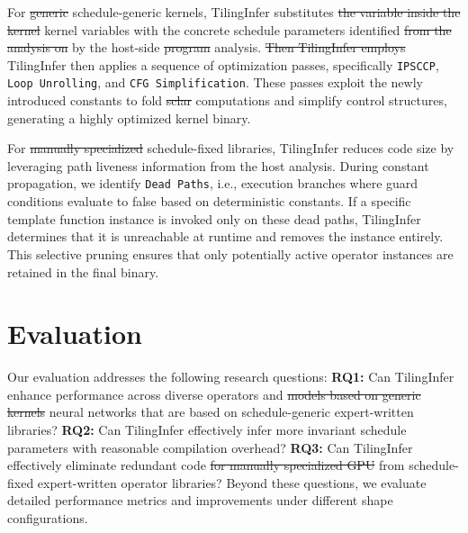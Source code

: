 \documentclass[manuscript,screen,review]{acmart}
\theoremstyle{indenteditalic}
\providecommand{\DIFaddtex}[1]{{\protect\color{blue}#1}} %
\providecommand{\DIFidentity}[1]{#1}
\providecommand{\DIFdeltex}[1]{{%
  \protect\color{red}%
  \normalfont\normalsize
  \let\textbf\DIFidentity
  \let\textit\DIFidentity
  \let\texttt\DIFidentity
  \let\textsc\DIFidentity
  \let\textsf\DIFidentity
  \let\emph\DIFidentity
  \let\uline\DIFidentity
  \sout{#1}%
}} %
\providecommand{\DIFaddbegin}{} %
\providecommand{\DIFaddend}{} %
\providecommand{\DIFdelbegin}{} %
\providecommand{\DIFdelend}{} %
\providecommand{\DIFadd}[1]{\texorpdfstring{\DIFaddtex{#1}}{#1}} %
\providecommand{\DIFdel}[1]{\texorpdfstring{\DIFdeltex{#1}}{}} %
\begin{document}
For \DIFdelbegin \DIFdel{generic }\DIFdelend \DIFaddbegin \DIFadd{schedule-generic }\DIFaddend kernels, TilingInfer substitutes \DIFdelbegin \DIFdel{the variable inside the kernel }\DIFdelend \DIFaddbegin \DIFadd{kernel variables }\DIFaddend with the concrete schedule parameters identified \DIFdelbegin \DIFdel{from the analysis on }\DIFdelend \DIFaddbegin \DIFadd{by }\DIFaddend the host-side \DIFdelbegin \DIFdel{program}\DIFdelend \DIFaddbegin \DIFadd{analysis}\DIFaddend .
\DIFdelbegin\DIFdel{Then TilingInfer employs}\DIFdelend\DIFaddbegin\DIFadd{TilingInfer then applies}\DIFaddend{} a sequence of optimization passes, specifically \texttt{IPSCCP}, \texttt{Loop Unrolling}, and \texttt{CFG Simplification}.
These passes exploit the newly introduced constants to fold \DIFdelbegin \DIFdel{sclar }\DIFdelend computations and simplify control structures, generating a highly optimized kernel binary.

For \DIFdelbegin \DIFdel{manually specialized }\DIFdelend \DIFaddbegin \DIFadd{schedule-fixed }\DIFaddend libraries, TilingInfer reduces code size by leveraging path liveness information from the host analysis.
During constant propagation, we identify \texttt{Dead Paths}, i.e., execution branches where guard conditions evaluate to false based on deterministic constants.
If a specific template function instance is invoked only on these dead paths, TilingInfer determines \DIFaddbegin\DIFadd{that }\DIFaddend it is unreachable at runtime and removes the instance entirely.
This selective pruning ensures that only potentially active operator instances are retained in the final binary.

\section{Evaluation}
\label{sec:eval}

Our evaluation addresses the following research questions: 
\textbf{RQ1:} Can TilingInfer enhance performance across diverse operators and \DIFdelbegin \DIFdel{models based on generic kernels}\DIFdelend \DIFaddbegin \DIFadd{neural networks that are based on schedule-generic expert-written libraries}\DIFaddend ?
\textbf{RQ2:} Can TilingInfer effectively infer more invariant \DIFaddbegin \DIFadd{schedule }\DIFaddend parameters with reasonable compilation overhead?
\textbf{RQ3:} Can TilingInfer effectively eliminate redundant code \DIFdelbegin \DIFdel{for manually specialized GPU }\DIFdelend \DIFaddbegin \DIFadd{from schedule-fixed expert-written operator }\DIFaddend libraries?
Beyond these questions, we evaluate detailed performance metrics and improvements under different shape configurations.
\end{document}
